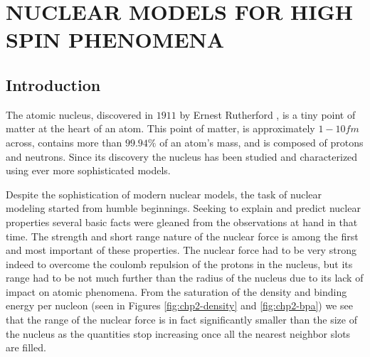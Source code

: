 %
%

\chapter{NUCLEAR MODELS FOR HIGH SPIN PHENOMENA}
\label{chp:models}

\section{Introduction}
\label{sec:models-into}
The atomic nucleus, discovered in $1911$ by Ernest Rutherford \cite{rutherfordNuclearModel}, is a tiny point of matter at the heart of an atom. This point of matter, is approximately $1-10fm$ across, contains more than $99.94\%$ of an atom's mass, and is composed of protons and neutrons. Since its discovery the nucleus has been studied and characterized using ever more sophisticated models.

Despite the sophistication of modern nuclear models, the task of nuclear modeling started from humble beginnings. Seeking to explain and predict nuclear properties several basic facts were gleaned from the observations at hand in that time. The strength and short range nature of the nuclear force is among the first and most important of these properties. The nuclear force had to be very strong indeed to overcome the coulomb repulsion of the protons in the nucleus, but its range had to be not much further than the radius of the nucleus due to its lack of impact on atomic phenomena. From the saturation of the density and binding energy per nucleon (seen in Figures \ref{fig:chp2-density} and \ref{fig:chp2-bpa}) we see that the range of the nuclear force is in fact significantly smaller than the size of the nucleus as the quantities stop increasing once all the nearest neighbor slots are filled.

